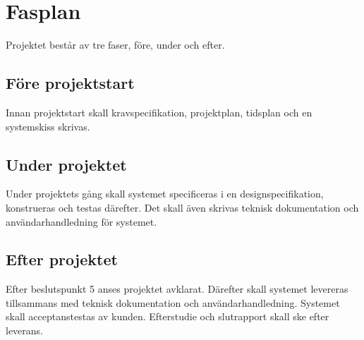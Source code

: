 \section{Fasplan}
Projektet består av tre faser, före, under och efter.

\subsection{Före projektstart}
Innan projektstart skall kravspecifikation, projektplan, tidsplan och en systemskiss skrivas.

\subsection{Under projektet}
Under projektets gång skall systemet specificeras i en designspecifikation, konstrueras och testas därefter. Det skall även skrivas teknisk dokumentation och användarhandledning för systemet.

\subsection{Efter projektet}
Efter beslutspunkt 5 anses projektet avklarat. Därefter skall systemet levereras tillsammans med teknisk dokumentation och användarhandledning. Systemet skall acceptanstestas av kunden. Efterstudie och slutrapport skall ske efter leverans.